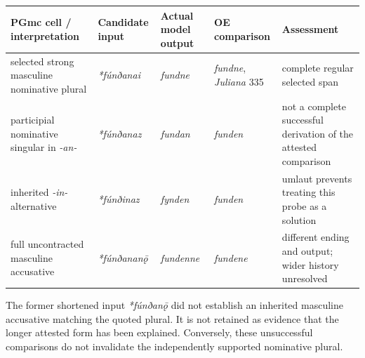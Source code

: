 \documentclass[
  british,
  a4paper,
]{article}
\newcounter{none} %
\providecommand{\Recon}[1]{\emph{*#1}}
\begin{document}
{\def\LTcaptype{none} %
\begin{longtable}[]{@{}
  >{\raggedright\arraybackslash}p{}
  >{\raggedright\arraybackslash}p{}
  >{\raggedright\arraybackslash}p{}
  >{\raggedright\arraybackslash}p{}
  >{\raggedright\arraybackslash}p{}@{}}
\toprule\noalign{}
\begin{minipage}[b]{\linewidth}\raggedright
PGmc cell / interpretation
\end{minipage} & \begin{minipage}[b]{\linewidth}\raggedright
Candidate input
\end{minipage} & \begin{minipage}[b]{\linewidth}\raggedright
Actual model output
\end{minipage} & \begin{minipage}[b]{\linewidth}\raggedright
OE comparison
\end{minipage} & \begin{minipage}[b]{\linewidth}\raggedright
Assessment
\end{minipage} \\
\midrule\noalign{}
\endhead
\bottomrule\noalign{}
\endlastfoot
selected strong masculine nominative plural & \Recon{fúnðanai} &
{\emph{fundne}} & {\emph{fundne}}, \emph{Juliana} 335 & complete regular
selected span \\
participial nominative singular in \emph{-an-} & \Recon{fúnðanaz} &
\emph{fundan} & {\emph{funden}} & not a complete successful derivation
of the attested comparison \\
inherited \emph{-in-} alternative & \Recon{fúnðinaz} & \emph{fynden} &
{\emph{funden}} & umlaut prevents treating this probe as a solution \\
full uncontracted masculine accusative & \Recon{fúnðananǭ} &
\emph{fundenne} & {\emph{fundene}} & different ending and output; wider
history unresolved \\
\end{longtable}
}

The former shortened input \Recon{fúnðanǭ} did not establish an
inherited masculine accusative matching the quoted plural. It is not
retained as evidence that the longer attested form has been explained.
Conversely, these unsuccessful comparisons do not invalidate the
independently supported nominative plural.
\end{document}
